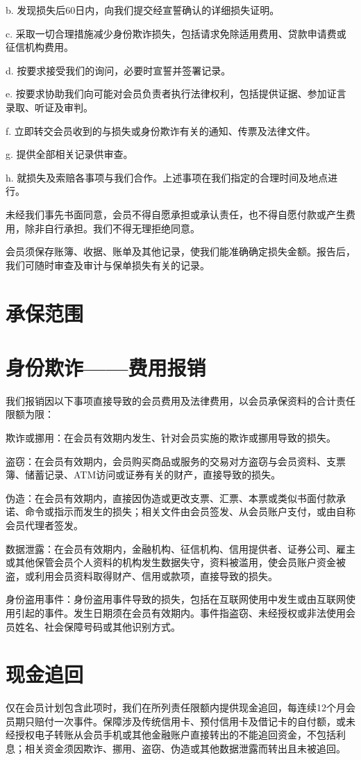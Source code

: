 \documentclass[UTF8,fontset=none,11pt,a4paper]{ctexart}
\begin{document}
b. 发现损失后60日内，向我们提交经宣誓确认的详细损失证明。


c. 采取一切合理措施减少身份欺诈损失，包括请求免除适用费用、贷款申请费或征信机构费用。


d. 按要求接受我们的询问，必要时宣誓并签署记录。


e. 按要求协助我们向可能对会员负责者执行法律权利，包括提供证据、参加证言录取、听证及审判。


f. 立即转交会员收到的与损失或身份欺诈有关的通知、传票及法律文件。


g. 提供全部相关记录供审查。


h. 就损失及索赔各事项与我们合作。上述事项在我们指定的合理时间及地点进行。


未经我们事先书面同意，会员不得自愿承担或承认责任，也不得自愿付款或产生费用，除非自行承担。我们不得无理拒绝同意。


会员须保存账簿、收据、账单及其他记录，使我们能准确确定损失金额。报告后，我们可随时审查及审计与保单损失有关的记录。


\section*{承保范围}
\section*{身份欺诈——费用报销}
我们报销因以下事项直接导致的会员费用及法律费用，以会员承保资料的合计责任限额为限：


欺诈或挪用：在会员有效期内发生、针对会员实施的欺诈或挪用导致的损失。


盗窃：在会员有效期内，会员购买商品或服务的交易对方盗窃与会员资料、支票簿、储蓄记录、ATM访问或证券有关的财产，直接导致的损失。


伪造：在会员有效期内，直接因伪造或更改支票、汇票、本票或类似书面付款承诺、命令或指示而发生的损失；相关文件由会员签发、从会员账户支付，或由自称会员代理者签发。


数据泄露：在会员有效期内，金融机构、征信机构、信用提供者、证券公司、雇主或其他保管会员个人资料的机构发生数据失守，资料被滥用，使会员账户资金被盗，或利用会员资料取得财产、信用或款项，直接导致的损失。


身份盗用事件：身份盗用事件导致的损失，包括在互联网使用中发生或由互联网使用引起的事件。发生日期须在会员有效期内。事件指盗窃、未经授权或非法使用会员姓名、社会保障号码或其他识别方式。


\section*{现金追回}
仅在会员计划包含此项时，我们在所列责任限额内提供现金追回，每连续12个月会员期只赔付一次事件。保障涉及传统信用卡、预付信用卡及借记卡的自付额，或未经授权电子转账从会员手机或其他金融账户直接转出的不能追回资金，不包括利息；相关资金须因欺诈、挪用、盗窃、伪造或其他数据泄露而转出且未被追回。
\end{document}
